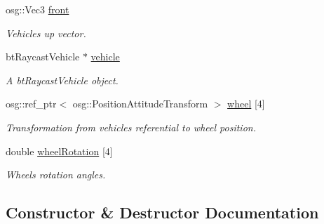 \begin{DoxyCompactItemize}
\mbox{\label{classbtosgVehicle_a5b21a5ad3a8583f773bce6b894ac010d}} 
osg\+::\+Vec3 \hyperlink{classbtosgVehicle_a5b21a5ad3a8583f773bce6b894ac010d}{front}
\begin{DoxyCompactList}\small\item\em Vehicle\textquotesingle{}s up vector. \end{DoxyCompactList}\item 
\mbox{\label{classbtosgVehicle_ac45b117f8b523f7040de99639deb7522}} 
bt\+Raycast\+Vehicle $\ast$ \hyperlink{classbtosgVehicle_ac45b117f8b523f7040de99639deb7522}{vehicle}
\begin{DoxyCompactList}\small\item\em A bt\+Raycast\+Vehicle object. \end{DoxyCompactList}\item 
\mbox{\label{classbtosgVehicle_a37edb4c28551037829ffd79c7bc315ba}} 
osg\+::ref\+\_\+ptr$<$ osg\+::\+Position\+Attitude\+Transform $>$ \hyperlink{classbtosgVehicle_a37edb4c28551037829ffd79c7bc315ba}{wheel} \mbox{[}4\mbox{]}
\begin{DoxyCompactList}\small\item\em Transformation from vehicle\textquotesingle{}s referential to wheel position. \end{DoxyCompactList}\item 
\mbox{\label{classbtosgVehicle_a0a9cd6f2c9b0defc44cd5e2e8d597418}} 
double \hyperlink{classbtosgVehicle_a0a9cd6f2c9b0defc44cd5e2e8d597418}{wheel\+Rotation} \mbox{[}4\mbox{]}
\begin{DoxyCompactList}\small\item\em Wheels\textquotesingle{} rotation angles. \end{DoxyCompactList}\end{DoxyCompactItemize}


\subsection{Constructor \& Destructor Documentation}
\mbox{\label{classbtosgVehicle_a462222cde5a3480b8964b582fcbf39a3}} 
